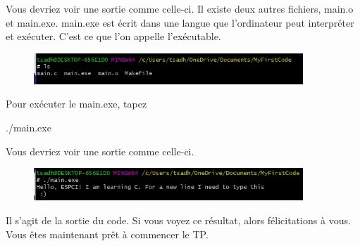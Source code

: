 \documentclass{article}
\begin{document}
Vous devriez voir une sortie comme celle-ci. Il existe deux autres fichiers, main.o et main.exe. main.exe est écrit dans une langue que l'ordinateur peut interpréter et exécuter. C'est ce que l'on appelle l'exécutable.
 \begin{figure}[H]
\center
\includegraphics[width=0.9\textwidth]{Plots/FirstCode_7.jpeg}
\end{figure}
Pour exécuter le main.exe, tapez
\begin{tcolorbox}[width=\textwidth,colframe=MidnightBlue,colback={black},title={Ceci est la console MinGW-w64 Win64 Shell},outer arc=0mm,colupper=white]    
      ./main.exe
\end{tcolorbox}
Vous devriez voir une sortie comme celle-ci. 
\begin{figure}[H]
\center
\includegraphics[width=0.9\textwidth]{Plots/FirstCode_8.jpeg}
\end{figure}
Il s'agit de la sortie du code. Si vous voyez ce résultat, alors félicitations à vous. Vous êtes maintenant prêt à commencer le TP.



%  
\end{document}
